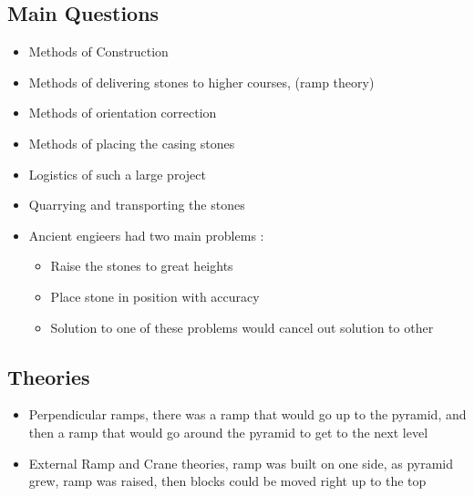 \documentclass{article}
\begin{document}
\subsection{Main Questions}
\begin{itemize}
  \item Methods of Construction
  \item Methods of delivering stones to higher courses,
    (ramp theory)
  \item Methods of orientation correction
  \item Methods of placing the casing stones
  \item Logistics of such a large project
  \item Quarrying and transporting the stones
  \item Ancient engieers had two main problems :
    \begin{itemize}
      \item Raise the stones to great heights
      \item Place stone in position with accuracy
      \item Solution to one of these problems
        would cancel out solution to other
    \end{itemize}
\end{itemize}

\subsection{Theories}
\begin{itemize}
  \item Perpendicular ramps, there was a ramp that would
    go up to the pyramid, and then a ramp that would go around the pyramid
    to get to the next level
  \item External Ramp and Crane theories,
    ramp was built on one side,
    as pyramid grew, ramp was raised,
    then blocks could be moved right up to the top
\end{itemize}
\end{document}
